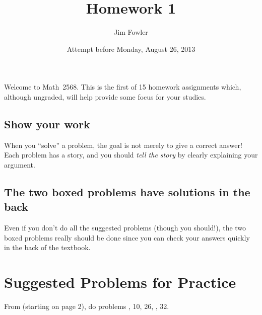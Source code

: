 \documentclass[12pt]{handout}
\title{Homework 1}
\date{Attempt before Monday, August 26, 2013}
\author{Jim Fowler}
\begin{document}
\maketitle

Welcome to Math~2568.  This is the first of 15 homework assignments which, although ungraded, will help provide some focus for your studies.







\subsection*{Show your work}
When you ``solve'' a problem, the goal is not merely to give a correct answer!  Each problem has a story, and you should \textit{tell the story} by clearly explaining your argument.


\subsection*{The two boxed problems have solutions in the back}
Even if you don't do all the suggested problems (though you should!), the two boxed problems really should be done since you can check your answers quickly in the back of the textbook.

\section*{Suggested Problems for Practice}

From  (starting on page 2),
do problems , 10, 26, , 32.
\vspace{1ex}
\end{document}
